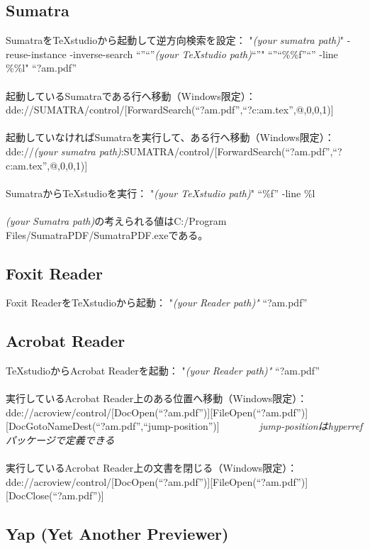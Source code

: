 \documentclass[]{book}
\begin{document}
\subsection{Sumatra}

SumatraをTeXstudioから起動して逆方向検索を設定： "\emph{(your sumatra
path)}" -reuse-instance -inverse-search ``''``''\emph{(your TeXstudio
path)}``''" ``''``\%\%f''``'' -line \%\%l" ``?am.pdf''\\\\
起動しているSumatraである行へ移動（Windows限定）：
dde://SUMATRA/control/{[}ForwardSearch(``?am.pdf'',``?c:am.tex'',@,0,0,1){]}\\\\
起動していなければSumatraを実行して、ある行へ移動（Windows限定）：
dde://\emph{(your sumatra
path)}:SUMATRA/control/{[}ForwardSearch(``?am.pdf'',``?c:am.tex'',@,0,0,1){]}\\\\
SumatraからTeXstudioを実行： "\emph{(your TeXstudio path)}" ``\%f'' -line
\%l \\\\ \emph{(your Sumatra path)}の考えられる値はC:/Program
Files/SumatraPDF/SumatraPDF.exeである。

\subsection{Foxit Reader}

Foxit ReaderをTeXstudioから起動： "\emph{(your Reader path)"} ``?am.pdf''

\subsection{Acrobat Reader}

TeXstudioからAcrobat Readerを起動： "\emph{(your Reader path)"}
``?am.pdf''\\\\ 実行しているAcrobat
Reader上のある位置へ移動（Windows限定）：
dde://acroview/control/{[}DocOpen(``?am.pdf''){]}{[}FileOpen(``?am.pdf''){]}{[}DocGotoNameDest(``?am.pdf'',``jump-position''){]}
~~ ~~ ~~\emph{jump-positionはhyperrefパッケージで定義できる}\\\\
実行しているAcrobat Reader上の文書を閉じる（Windows限定）：
dde://acroview/control/{[}DocOpen(``?am.pdf''){]}{[}FileOpen(``?am.pdf''){]}{[}DocClose(``?am.pdf''){]}

\subsection{Yap (Yet Another Previewer)}
\end{document}

